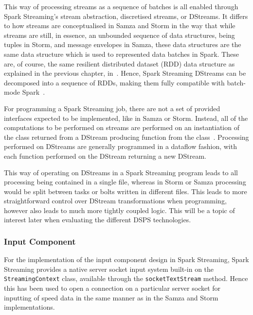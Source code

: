 This way of processing streams as a sequence of batches is all enabled through Spark Streaming's stream abstraction,
discretised streams, or DStreams. It differs to how streams are conceptualised in Samza and Storm in the way that while
streams are still, in essence, an unbounded sequence of data structures, being tuples in Storm, and message envelopes in
Samza, these data structures are the same data structure which is used to represented data batches in Spark. These are,
of course, the same resilient distributed dataset (RDD) data structure as explained in the previous chapter, in~.
Hence, Spark Streaming DStreams can be decomposed into a sequence of RDDs, making them fully compatible with batch-mode Spark~\cite{spark_stream_doc}.

For programming a Spark Streaming job, there are not a set of provided interfaces expected to be implemented, like in
Samza or Storm. Instead, all of the computations to be performed on streams are performed on an instantiation of the
 class returned from a DStream producing function from the
 class~\cite{spark_stream_doc}. Processing performed on DStreams are generally programmed in
a dataflow fashion, with each function performed on the DStream returning a new DStream.

This way of operating on DStreams in a Spark Streaming program leads to all processing being contained in a single file,
whereas in Storm or Samza processing would be split between tasks or bolts written in different files. This leads to
more straightforward control over DStream transformations when programming, however also leads to much more tightly
coupled logic. This will be a topic of interest later when evaluating the different DSPS technologies.

\subsubsection{Input Component}

For the implementation of the input component design in Spark Streaming, Spark Streaming provides a native server socket input
system built-in on the \texttt{StreamingContext} class, available through the \texttt{socketTextStream} method. Hence
this has been used to open a connection on a particular server socket for inputting of speed data in the same manner as in the
Samza and Storm implementations.

